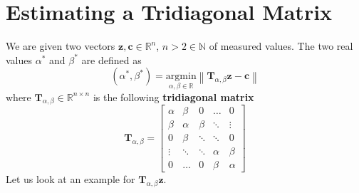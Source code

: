 \documentclass{article}
\begin{document}
\section*{Estimating a Tridiagonal Matrix}
We are given two vectors $\mathbf{z}, \mathbf{c} \in \mathbb{R}^{n}$, $n > 2 \in \mathbb{N}$ of measured values. The two real values $\alpha^{*}$ and $\beta^{*}$ are defined as
\begin{equation*}
    \left(\alpha^{*}, \beta^{*}\right) = \underset{\alpha,\beta \in \mathbb{R}}{\text{argmin}} \left\lVert \mathbf{T}_{\alpha, \beta}\mathbf{z} - \mathbf{c}\right\rVert
\end{equation*}
where $\mathbf{T}_{\alpha, \beta} \in \mathbb{R}^{n \times n}$ is the following \textbf{tridiagonal matrix}
\begin{equation*}
    \mathbf{T}_{\alpha,\beta} = \begin{bmatrix}
    \alpha & \beta & 0 & \dots & 0  \\
    \beta & \alpha & \beta & \ddots & \vdots \\
    0 & \beta & \ddots & \ddots & 0 \\
    \vdots & \ddots & \ddots & \alpha & \beta \\
    0 & \dots & 0 & \beta & \alpha
    \end{bmatrix}
\end{equation*}
Let us look at an example for $\mathbf{T}_{\alpha, \beta}\mathbf{z}$.
\end{document}
